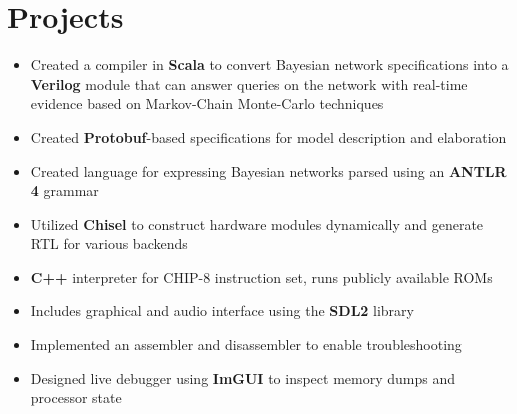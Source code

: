 \documentclass{moderncv}
\begin{document}
\section{Projects}
{\begin{itemize}
    \item Created a compiler in \textbf{Scala} to convert Bayesian network specifications into a \textbf{Verilog} module that can answer queries on the network with real-time evidence based on Markov-Chain Monte-Carlo techniques
    \item Created \textbf{Protobuf}-based specifications for model description and elaboration
    \item Created language for expressing Bayesian networks parsed using an \textbf{ANTLR 4} grammar
    \item Utilized \textbf{Chisel} to construct hardware modules dynamically and generate RTL for various backends
\end{itemize}}

{\begin{itemize}
    \item \textbf{C++} interpreter for CHIP-8 instruction set, runs publicly available ROMs
    \item Includes graphical and audio interface using the \textbf{SDL2} library
    \item Implemented an assembler and disassembler to enable troubleshooting
    \item Designed live debugger using \textbf{ImGUI} to inspect memory dumps and processor state
\end{itemize}}

\begin{comment}
\cventry{Dec 2021 - Jan 2022}{3D Rasterized Render System}{}{C++ | CMake | OpenGL}{}
{\begin{itemize}
    \item 3D rasterized rendering system written with \textbf{OpenGL 3.3} in \textbf{C++17}
    \item Implemented mesh generation, texture loading and Phong lighting shaders
\end{itemize}}
\end{comment}
\end{document}
